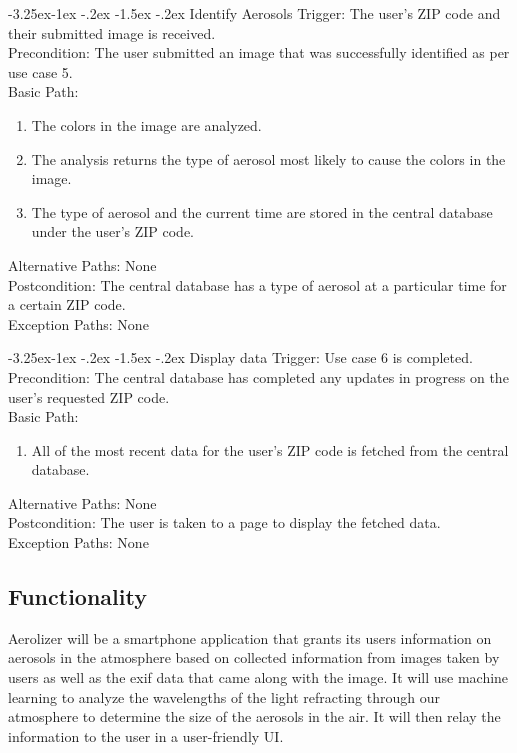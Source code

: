 \documentclass[journal,10pt,draftclsnofoot,onecolumn]{IEEEtran}
\makeatletter
\renewcommand\subsubsection{\@startsection{subsubsection}{3}{\z@}%
                                     {-3.25ex\@plus -1ex \@minus -.2ex}%
                                     {-1.5ex \@plus -.2ex}%
                                     {\normalfont\normalsize\bfseries}}
\makeatother
\begin{document}
\begin{singlespace}
		\subsubsection{Identify Aerosols}
			Trigger: The user's ZIP code and their submitted image is received.\\
			Precondition: The user submitted an image that was successfully identified as per use case 5.\\
			Basic Path:
			\begin{enumerate}
				\item The colors in the image are analyzed.
				\item The analysis returns the type of aerosol most likely to cause the colors in the image.
				\item The type of aerosol and the current time are stored in the central database under the user's ZIP code.
			\end{enumerate}
			Alternative Paths: None\\
			Postcondition: The central database has a type of aerosol at a particular time for a certain ZIP code.\\
			Exception Paths: None
		
		\subsubsection{Display data}
			Trigger: Use case 6 is completed.\\
			Precondition: The central database has completed any updates in progress on the user's requested ZIP code.\\
			Basic Path:
			\begin{enumerate}
				\item All of the most recent data for the user's ZIP code is fetched from the central database.
			\end{enumerate}
			Alternative Paths: None\\
			Postcondition: The user is taken to a page to display the fetched data.\\
			Exception Paths: None

	\subsection{Functionality}
		Aerolizer will be a smartphone application that grants its users information on aerosols in the atmosphere based on collected information from images taken by users as well as the exif data that came along with the image.
		It will use machine learning to analyze the wavelengths of the light refracting through our atmosphere to determine the size of the aerosols in the air. It will then relay the information to the user in a user-friendly UI. 


\end{singlespace}
\end{document}
